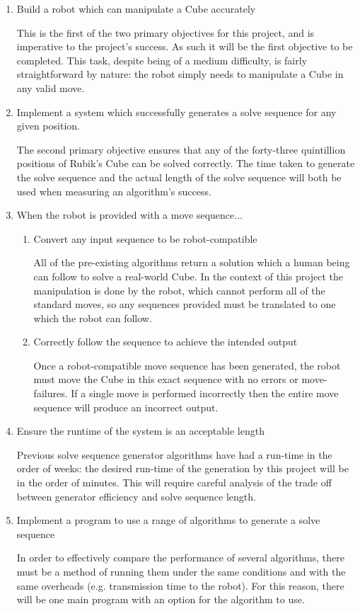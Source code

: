 \documentclass{report}
\begin{document}
    \begin{enumerate}
    	\item Build a robot which can manipulate a Cube accurately \par This is the first of the two primary objectives for this project, and is imperative to the project's success. As such it will be the first objective to be completed. This task, despite being of a medium difficulty, is fairly straightforward by nature: the robot simply needs to manipulate a Cube in any valid move.
    	\item Implement a system which successfully generates a solve sequence for any given position. \par The second primary objective ensures that any of the forty-three quintillion positions of Rubik's Cube can be solved correctly. The time taken to generate the solve sequence and the actual length of the solve sequence will both be used when measuring an algorithm's success.
    	\item When the robot is provided with a move sequence...
    	\begin{enumerate}
    		\item Convert any input sequence to be robot-compatible \par All of the pre-existing algorithms return a solution which a human being can follow to solve a real-world Cube. In the context of this project the manipulation is done by the robot, which cannot perform all of the standard moves, so any sequences provided must be translated to one which the robot can follow.
    		\item Correctly follow the sequence to achieve the intended output \par Once a robot-compatible move sequence has been generated, the robot must move the Cube in this exact sequence with no errors or move-failures. If a single move is performed incorrectly then the entire move sequence will produce an incorrect output.
    	\end{enumerate}
    	\item Ensure the runtime of the system is an acceptable length \par Previous solve sequence generator algorithms have had a run-time in the order of weeks: the desired run-time of the generation by this project will be in the order of minutes. This will require careful analysis of the trade off between generator efficiency and solve sequence length.
    	\item Implement a program to use a range of algorithms to generate a solve sequence \par In order to effectively compare the performance of several algorithms, there must be a method of running them under the same conditions and with the same overheads (e.g. transmission time to the robot). For this reason, there will be one main program with an option for the algorithm to use.

\end{enumerate}
\end{document}

